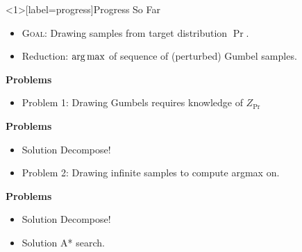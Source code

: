 \begin{frame}<1>[label=progress]{Progress So Far}
  \begin{itemize}[<+->]
  \item \textsc{Goal}: Drawing samples from target distribution $\Pr$.
  \item Reduction: $\operatorname*{{arg\,max}}$ of sequence of (perturbed) Gumbel samples. %
  \end{itemize}
  \begin{overprint}

    \textbf{Problems}
    \begin{itemize}
    \item {\color{red}Problem 1:} Drawing Gumbels requires knowledge of $Z_{\Pr}$        %
    \end{itemize}

    \textbf{Problems}
    \begin{itemize} 
    \item {\color{blue} Solution} Decompose! %
    \item {\color{red} Problem 2:} Drawing infinite samples to compute argmax on. %
    \end{itemize}

    \textbf{Problems}
    \begin{itemize} 
    \item {\color{blue} Solution} Decompose! %
    \item {\color{blue} Solution} A* search.
    \end{itemize}
  \end{overprint}
\end{frame}



